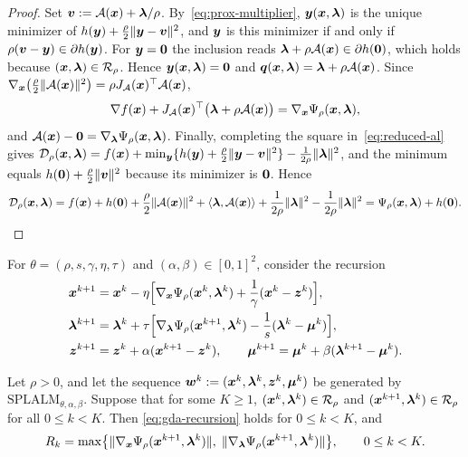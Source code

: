 \begin{proof}
Set \(\bm{v}:=\mathcal{A}(\bm{x})+\bm{\lambda}/\rho\). By~\eqref{eq:prox-multiplier}, \(\bm{y}(\bm{x},\bm{\lambda})\)
is the unique minimizer of \(h(\bm{y})+\frac{\rho}{2}\|\bm{y}-\bm{v}\|^2\), and
\(\bm{y}\) is this minimizer if and only if \(\rho(\bm{v}-\bm{y})\in\partial h(\bm{y})\).
For \(\bm{y}=\bm{0}\) the inclusion reads
\(\bm{\lambda}+\rho\mathcal{A}(\bm{x})\in\partial h(\bm{0})\), which holds because
\((\bm{x},\bm{\lambda})\in\mathcal R_\rho\). Hence \(\bm{y}(\bm{x},\bm{\lambda})=\bm{0}\) and
\(\bm{q}(\bm{x},\bm{\lambda})=\bm{\lambda}+\rho\mathcal{A}(\bm{x})\). Since
\(\nabla_{\bm{x}}\bigl(\frac{\rho}{2}\|\mathcal{A}(\bm{x})\|^2\bigr)=\rho J_{\mathcal{A}}(\bm{x})^\top\mathcal{A}(\bm{x})\),
\[
\nabla f(\bm{x})+J_{\mathcal{A}}(\bm{x})^\top\bigl(\bm{\lambda}+\rho\mathcal{A}(\bm{x})\bigr)
=\nabla_{\bm{x}}\Psi_\rho(\bm{x},\bm{\lambda}),
\]
and \(\mathcal{A}(\bm{x})-\bm{0}=\nabla_{\bm{\lambda}}\Psi_\rho(\bm{x},\bm{\lambda})\).
Finally, completing the square in~\eqref{eq:reduced-al} gives
\(\mathcal{D}_\rho(\bm{x},\bm{\lambda})=f(\bm{x})+\min_{\bm{y}}\{h(\bm{y})+\frac{\rho}{2}\|\bm{y}-\bm{v}\|^2\}
-\frac{1}{2\rho}\|\bm{\lambda}\|^2\), and the minimum equals
\(h(\bm{0})+\frac{\rho}{2}\|\bm{v}\|^2\) because its minimizer is \(\bm{0}\). Hence
\[
\mathcal{D}_\rho(\bm{x},\bm{\lambda})
=f(\bm{x})+h(\bm{0})+\frac{\rho}{2}\|\mathcal{A}(\bm{x})\|^2+\langle\bm{\lambda},\mathcal{A}(\bm{x})\rangle
+\frac{1}{2\rho}\|\bm{\lambda}\|^2-\frac{1}{2\rho}\|\bm{\lambda}\|^2
=\Psi_\rho(\bm{x},\bm{\lambda})+h(\bm{0}).
\]
\end{proof}

For \(\theta=(\rho,s,\gamma,\eta,\tau)\) and \((\alpha,\beta)\in[0,1]^2\), consider
the recursion
\begin{equation}\label{eq:gda-recursion}
\begin{aligned}
\bm{x}^{k+1}&=\bm{x}^k-\eta\Bigl[\nabla_{\bm{x}}\Psi_\rho(\bm{x}^k,\bm{\lambda}^k)
  +\frac{1}{\gamma}(\bm{x}^k-\bm{z}^k)\Bigr],\\
\bm{\lambda}^{k+1}&=\bm{\lambda}^k+\tau\Bigl[\nabla_{\bm{\lambda}}\Psi_\rho(\bm{x}^{k+1},\bm{\lambda}^k)
  -\frac{1}{s}(\bm{\lambda}^k-\bm{\mu}^k)\Bigr],\\
\bm{z}^{k+1}&=\bm{z}^k+\alpha(\bm{x}^{k+1}-\bm{z}^k),\qquad
\bm{\mu}^{k+1}=\bm{\mu}^k+\beta(\bm{\lambda}^{k+1}-\bm{\mu}^k).
\end{aligned}
\end{equation}

\begin{proposition}[Embedding]
\label{prop:embedding}
Let \(\rho>0\), and let the sequence
\(\bm{w}^k:=(\bm{x}^k,\bm{\lambda}^k,\bm{z}^k,\bm{\mu}^k)\) be generated by
\(\mathrm{SPLALM}_{\theta,\alpha,\beta}\). Suppose that for some \(K\ge1\),
\((\bm{x}^k,\bm{\lambda}^k)\in\mathcal R_\rho\) and
\((\bm{x}^{k+1},\bm{\lambda}^k)\in\mathcal R_\rho\) for all \(0\le k<K\).
Then \eqref{eq:gda-recursion} holds for \(0\le k<K\), and
\[
R_k=\max\bigl\{\|\nabla_{\bm{x}}\Psi_\rho(\bm{x}^{k+1},\bm{\lambda}^k)\|,\;
\|\nabla_{\bm{\lambda}}\Psi_\rho(\bm{x}^{k+1},\bm{\lambda}^k)\|\bigr\},
\qquad 0\le k<K.
\]
\end{proposition}

